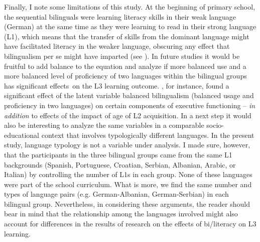 \documentclass[output=paper,modfonts,nonflat,newtxmath]{langsci/langscibook}
\begin{document}
Finally, I note some limitations of this study. At the beginning of primary school, the sequential bilinguals were learning literacy skills in their weak language (German) at the same time as they were learning to read in their strong language (L1), which means that the transfer of skills from the dominant language might have facilitated literacy in the weaker language, obscuring any effect that bilingualism per se might have imparted (see \citealt{Bialystok2007}). In future studies it would be fruitful to add balance to the equation and analyze if more balanced use and a more balanced level of proficiency of two languages within the bilingual groups has significant effects~on the L3 learning outcome. \citet{YowLi2015}, for instance, found a significant effect of the latent variable balanced bilingualism (balanced usage and proficiency in two languages) on certain components of executive functioning – \textit{in} \textit{addition} to effects of the impact of age of L2 acquisition. In a next step it would also be interesting to analyze the same variables in a comparable socio-educational context that involves typologically different languages. In the present study, language typology is not a variable under analysis. I made sure, however, that the participants in the three bilingual groups came from the same L1 backgrounds (Spanish, Portuguese, Croatian, Serbian, Albanian, Arabic, or Italian) by controlling the number of L1s in each group. None of these languages were part of the school curriculum. What is more, we find the same number and types of language pairs (e.g. German-Albanian, German-Serbian) in each bilingual group. Nevertheless, in considering these arguments, the reader should bear in mind that the relationship among the languages involved might also account for differences in the results of research on the effects of bi/literacy on L3 learning.
\end{document}
